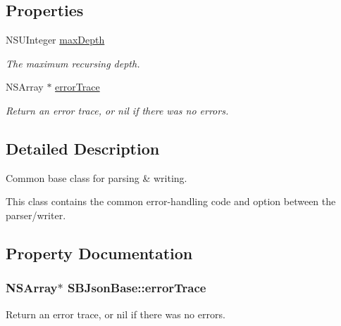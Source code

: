 \subsection*{\-Properties}
\begin{DoxyCompactItemize}
\item 
\-N\-S\-U\-Integer \hyperlink{interface_s_b_json_base_abe3e47517711570a9a57e2d92a15055b}{max\-Depth}
\begin{DoxyCompactList}\small\item\em \-The maximum recursing depth. \end{DoxyCompactList}\item 
\-N\-S\-Array $\ast$ \hyperlink{interface_s_b_json_base_aa83f0ee5efade2fd26ddf6591ffd8dc0}{error\-Trace}
\begin{DoxyCompactList}\small\item\em \-Return an error trace, or nil if there was no errors. \end{DoxyCompactList}\end{DoxyCompactItemize}


\subsection{\-Detailed \-Description}
\-Common base class for parsing \& writing. 

\-This class contains the common error-\/handling code and option between the parser/writer. 

\subsection{\-Property \-Documentation}
\hypertarget{interface_s_b_json_base_aa83f0ee5efade2fd26ddf6591ffd8dc0}{
\subsubsection[{error\-Trace}]{\setlength{\rightskip}{0pt plus 5cm}\-N\-S\-Array$\ast$ \-S\-B\-Json\-Base\-::error\-Trace}}
\label{interface_s_b_json_base_aa83f0ee5efade2fd26ddf6591ffd8dc0}


\-Return an error trace, or nil if there was no errors. 

